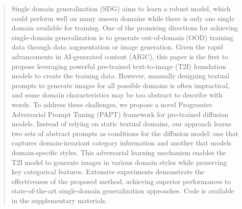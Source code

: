 \begin{abstract}
Single domain generalization (SDG) aims to learn a robust model, which could perform well on many unseen domains while there is only one single domain available for training. 
One of the promising directions for achieving single-domain generalization is to generate out-of-domain (OOD) training data through data augmentation or image generation. Given the rapid advancements in AI-generated content (AIGC), this paper is the first to propose leveraging powerful pre-trained text-to-image (T2I) foundation models to create the training data. However, manually designing textual prompts to generate images for all possible domains is often impractical, and some domain characteristics may be too abstract to describe with words.
To address these challenges, we propose a novel Progressive Adversarial Prompt Tuning (PAPT) framework for pre-trained diffusion models. Instead of relying on static textual domains, our approach learns two sets of abstract prompts as conditions for the diffusion model: one that captures domain-invariant category information and another that models domain-specific styles. 
This adversarial learning mechanism enables the T2I model to generate images in various domain styles while preserving key categorical features.
Extensive experiments demonstrate the effectiveness of the proposed method, achieving superior performances to state-of-the-art single-domain generalization approaches. Code is available in the supplementary materials.
\end{abstract}